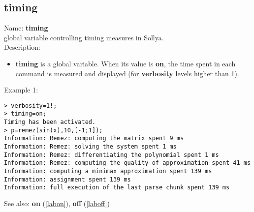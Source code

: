 \subsection{timing}
\label{labtiming}
\noindent Name: \textbf{timing}\\
global variable controlling timing measures in Sollya.\\

\noindent Description: \begin{itemize}

\item \textbf{timing} is a global variable. When its value is \textbf{on}, the time spent in each 
   command is measured and displayed (for \textbf{verbosity} levels higher than 1).
\end{itemize}
\noindent Example 1: 
\begin{center}\begin{minipage}{15cm}\begin{Verbatim}[frame=single]
> verbosity=1!;
> timing=on;
Timing has been activated.
> p=remez(sin(x),10,[-1;1]);
Information: Remez: computing the matrix spent 9 ms
Information: Remez: solving the system spent 1 ms
Information: Remez: differentiating the polynomial spent 1 ms
Information: Remez: computing the quality of approximation spent 41 ms
Information: computing a minimax approximation spent 139 ms
Information: assignment spent 139 ms
Information: full execution of the last parse chunk spent 139 ms
\end{Verbatim}
\end{minipage}\end{center}
See also: \textbf{on} (\ref{labon}), \textbf{off} (\ref{laboff})
